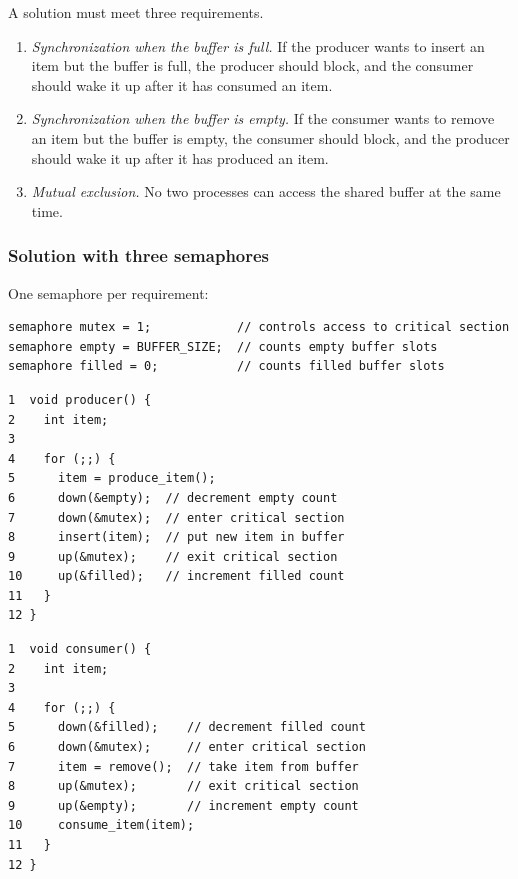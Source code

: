 A solution must meet three requirements.
\begin{enumerate}
  \item \emph{Synchronization when the buffer is full.} If the producer wants to insert an item but the buffer is full, the producer should block, and the consumer should wake it up after it has consumed an item.
  \item \emph{Synchronization when the buffer is empty.} If the consumer wants to remove an item but the buffer is empty, the consumer should block, and the producer should wake it up after it has produced an item.
  \item \emph{Mutual exclusion.} No two processes can access the shared buffer at the same time.
\end{enumerate}

\subsubsection{Solution with three semaphores} One semaphore per requirement:
\begin{lstlisting}
semaphore mutex = 1;            // controls access to critical section
semaphore empty = BUFFER_SIZE;  // counts empty buffer slots
semaphore filled = 0;           // counts filled buffer slots
\end{lstlisting}
\begin{center}
\begin{minipage}[t]{0.49\textwidth}
\begin{lstlisting}[basicstyle=\ttfamily\footnotesize]
1  void producer() {
2    int item;
3
4    for (;;) {
5      item = produce_item();
6      down(&empty);  // decrement empty count
7      down(&mutex);  // enter critical section
8      insert(item);  // put new item in buffer
9      up(&mutex);    // exit critical section
10     up(&filled);   // increment filled count
11   }
12 }
\end{lstlisting}
\end{minipage}\hfill
\begin{minipage}[t]{0.49\textwidth}
\begin{lstlisting}[basicstyle=\ttfamily\footnotesize]
1  void consumer() {
2    int item;
3
4    for (;;) {
5      down(&filled);    // decrement filled count
6      down(&mutex);     // enter critical section
7      item = remove();  // take item from buffer
8      up(&mutex);       // exit critical section
9      up(&empty);       // increment empty count
10     consume_item(item);
11   }
12 }
\end{lstlisting}
\end{minipage}
\end{center}

